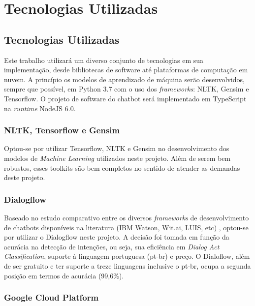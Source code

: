 \documentclass[]{politex}
\begin{document}
\part{Tecnologias Utilizadas}

\chapter{Tecnologias Utilizadas}

Este trabalho utilizará um diverso conjunto de tecnologias em sua implementação, desde bibliotecas de software até plataformas de computação em nuvem. A princípio os modelos de aprendizado de máquina serão desenvolvidos, sempre que possível, em Python 3.7 com o uso dos \textit{frameworks}: NLTK, Gensim e Tensorflow. O projeto de software do chatbot será implementado em TypeScript na \textit{runtime} NodeJS 6.0. 

\section{NLTK, Tensorflow e Gensim}

Optou-se por utilizar Tensorflow, NLTK e Gensim no desenvolvimento dos modelos de \textit{Machine Learning} utilizados neste projeto. Além de serem bem robustos, esses toolkits são bem completos no sentido de atender as demandas deste projeto.

\section{Dialogflow}

Baseado no estudo comparativo entre os diversos \textit{frameworks} de desenvolvimento de chatbots disponíveis na literatura (IBM Watson, Wit.ai, LUIS, etc) \cite{Correa-et-al-2018}, optou-se por utilizar o Dialogflow neste projeto. A decisão foi tomada em função da acurácia na detecção de intenções, ou seja, sua eficiência em  \textit{Dialog Act Classification}, suporte à linguagem portuguesa (pt-br) e preço. O Dialoflow, além de ser gratuito e ter suporte a treze linguagens inclusive o pt-br, ocupa a segunda posição em termos de acurácia (99,6\%). 

\section{Google Cloud Platform}
\end{document}
